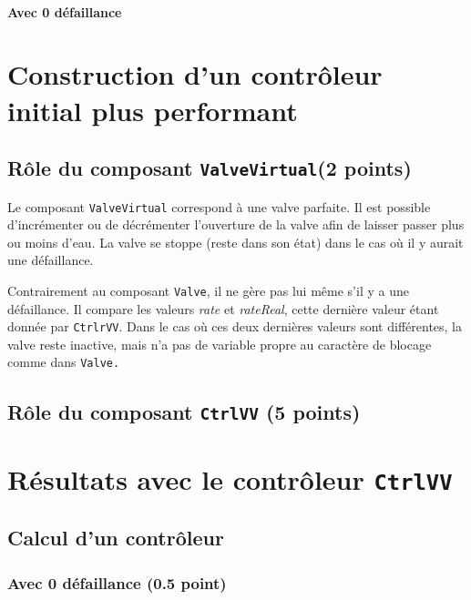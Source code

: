 \documentclass[a4paper]{book}
\begin{document}
\paragraph{Avec 0 défaillance}


\section{Construction d'un contrôleur initial plus performant}
\subsection{Rôle du composant {\tt ValveVirtual}(2 points)}
Le composant {\tt ValveVirtual} correspond à une valve parfaite. Il est possible d'incrémenter ou de décrémenter l'ouverture 
de la valve afin de laisser passer plus ou moins d'eau. La valve se stoppe (reste dans son état) dans le cas où il y aurait une défaillance.

Contrairement au composant {\tt Valve}, il ne gère pas lui même s'il y a une défaillance. Il compare les valeurs \textit{rate} et 
\textit{rateReal}, cette dernière valeur étant donnée par {\tt CtrlrVV}. Dans le cas où ces deux dernières valeurs sont différentes,
 la valve reste inactive, mais n'a pas de variable propre au caractère de blocage comme dans \tt{Valve}.

\subsection{Rôle du composant {\tt CtrlVV} (5 points)}

\section{Résultats avec le contrôleur {\tt CtrlVV}}
\subsection{Calcul d'un contrôleur}
\subsubsection{Avec 0 défaillance (0.5 point)}



%
%
\end{document}
